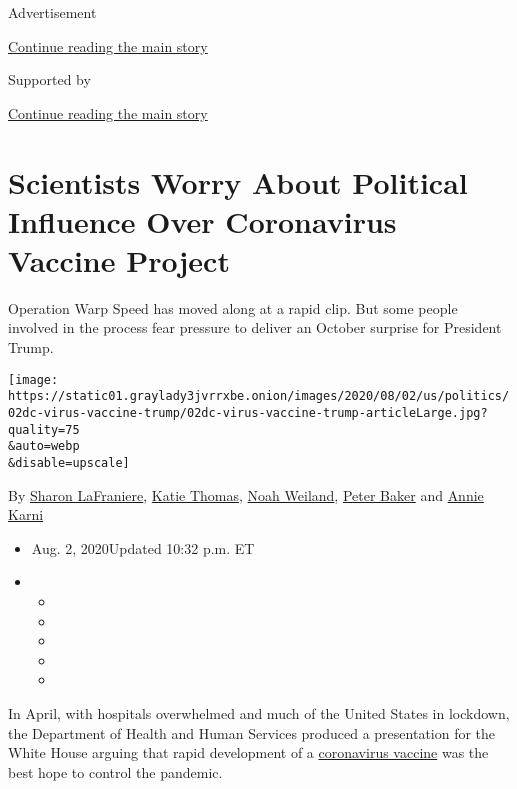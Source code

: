 Advertisement

\protect\hyperlink{after-top}{Continue reading the main story}

Supported by

\protect\hyperlink{after-sponsor}{Continue reading the main story}

\hypertarget{scientists-worry-about-political-influence-over-coronavirus-vaccine-project}{%
\section{Scientists Worry About Political Influence Over Coronavirus
Vaccine
Project}\label{scientists-worry-about-political-influence-over-coronavirus-vaccine-project}}

Operation Warp Speed has moved along at a rapid clip. But some people
involved in the process fear pressure to deliver an October surprise for
President Trump.

\texttt{[image: https://static01.graylady3jvrrxbe.onion/images/2020/08/02/us/politics/02dc-virus-vaccine-trump/02dc-virus-vaccine-trump-articleLarge.jpg?quality=75\\\&auto=webp\\\&disable=upscale]}

By \href{https://www.nytimes3xbfgragh.onion/by/sharon-lafraniere}{Sharon
LaFraniere},
\href{https://www.nytimes3xbfgragh.onion/by/katie-thomas}{Katie Thomas},
\href{https://www.nytimes3xbfgragh.onion/by/noah-weiland}{Noah Weiland},
\href{https://www.nytimes3xbfgragh.onion/by/peter-baker}{Peter Baker}
and \href{https://www.nytimes3xbfgragh.onion/by/annie-karni}{Annie
Karni}

\begin{itemize}
\item
  Aug. 2, 2020Updated 10:32 p.m. ET
\item
  \begin{itemize}
  \item
  \item
  \item
  \item
  \item
  \end{itemize}
\end{itemize}

In April, with hospitals overwhelmed and much of the United States in
lockdown, the Department of Health and Human Services produced a
presentation for the White House arguing that rapid development of a
\href{https://www.nytimes3xbfgragh.onion/interactive/2020/science/coronavirus-vaccine-tracker.html}{coronavirus
vaccine} was the best hope to control the pandemic.

